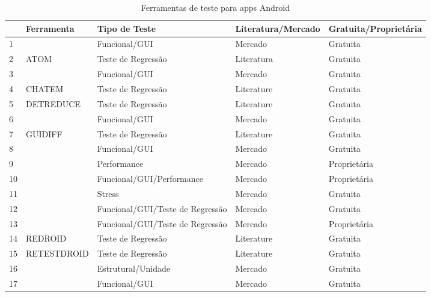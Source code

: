 \appendix
{}\label{sec:toolsandroid}

\begin{table}[h!]
\begin{center}
    \scriptsize
    \caption{Ferramentas de teste para apps Android}
    \label{table:androidtools}
    \def \arraystretch{1.2}
    
    \begin{tabular}{m{0.2cm}m{3cm}m{5cm}m{3cm}m{3cm}}
        \toprule
        \bf  & \bf Ferramenta & \bf Tipo de Teste & \bf Literatura/Mercado & \bf Gratuita/Proprietária\\ 
        \midrule
        1 & \cite{appium} & Funcional/GUI & Mercado & Gratuita\\\hline
        2 & ATOM & Teste de Regressão & Literatura & Gratuita\\\hline
        3 & \cite{calabash} & Funcional/GUI & Mercado & Gratuita\\\hline
        4 & CHATEM \cite{} & Teste de Regressão & Literature & Gratuita\\\hline
        5 & DETREDUCE \cite{} & Teste de Regressão & Literature & Gratuita\\\hline
        6 & \cite{espresso} & Funcional/GUI & Mercado & Gratuita\\\hline
        7 & GUIDIFF \cite{} & Teste de Regressão & Literature & Gratuita\\\hline
        8 & \cite{katalon} & Funcional/GUI & Mercado & Gratuita\\\hline
        9 & \cite{kmax} & Performance & Mercado & Proprietária\\\hline
        10 & \cite{kobiton} & Funcional/GUI/Performance & Mercado & Proprietária\\\hline
        11 & \cite{monkey} & Stress & Mercado & Gratuita\\\hline
        12 & \cite{monkeyrunner} & Funcional/GUI/Teste de Regressão & Mercado & Gratuita\\\hline
        13 & \cite{ranorex} & Funcional/GUI/Teste de Regressão & Mercado & Proprietária\\\hline
        14 & REDROID \cite{} & Teste de Regressão & Literature & Gratuita\\\hline
        15 & RETESTDROID \cite{} & Teste de Regressão & Literature & Gratuita\\\hline
        16 & \cite{roboeletric} & Estrutural/Unidade & Mercado & Gratuita\\\hline
        17 & \cite{robotium} & Funcional/GUI & Mercado & Gratuita\\\hline

\end{tabular}
\end{center}
\end{table}
